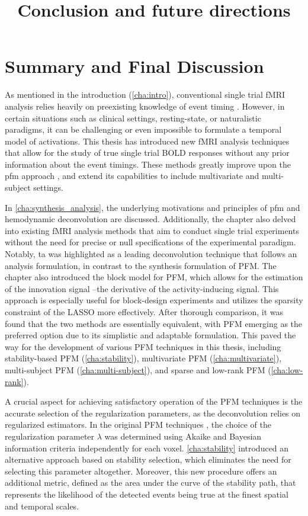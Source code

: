 \title{Conclusion and future directions}
\label{cha:conclusion}

\section{Summary and Final Discussion}

As mentioned in the introduction (\cref{cha:intro}), conventional single trial
fMRI analysis relies heavily on preexisting knowledge of event timing
\citep{Buckner1996Detectioncorticalactivation,Menon1998Mentalchronometryusing,Richter1997TimeresolvedfMRI}.
However, in certain situations such as clinical settings, resting-state, or
naturalistic paradigms, it can be challenging or even impossible to formulate a
temporal model of activations. This thesis has introduced new fMRI analysis
techniques that allow for the study of true single trial BOLD responses without
any prior information about the event timings. These methods greatly improve
upon the \acrlong*{pfm} approach \citep{Gaudes2013Paradigmfreemapping}, and
extend its capabilities to include multivariate and multi-subject settings.

In \cref{cha:synthesis_analysis}, the underlying motivations and principles of
\acrfull*{pfm} and hemodynamic deconvolution are discussed. Additionally, the
chapter also delved into existing fMRI analysis methods that aim to conduct
single trial experiments without the need for precise or null specifications of
the experimental paradigm. Notably, \acrfull*{ta} was highlighted as a leading
deconvolution technique that follows an analysis formulation, in contrast to the
synthesis formulation of PFM. The chapter also introduced the block model for
PFM, which allows for the estimation of the innovation signal --the derivative
of the activity-inducing signal. This approach is especially useful for
block-design experiments and utilizes the sparsity constraint of the LASSO more
effectively. After thorough comparison, it was found that the two methods are
essentially equivalent, with PFM emerging as the preferred option due to its
simplistic and adaptable formulation. This paved the way for the development of
various PFM techniques in this thesis, including stability-based PFM
(\cref{cha:stability}), multivariate PFM (\cref{cha:multivariate}),
multi-subject PFM (\cref{cha:multi-subject}), and sparse and low-rank PFM
(\cref{cha:low-rank}).

A crucial aspect for achieving satisfactory operation of the PFM techniques is
the accurate selection of the regularization parameters, as the deconvolution
relies on regularized estimators. In the original PFM techniques
\citep{Gaudes2013Paradigmfreemapping}, the choice of the regularization
parameter $\lambda$ was determined using Akaike and Bayesian information
criteria independently for each voxel. \cref{cha:stability} introduced an
alternative approach based on stability selection, which eliminates the need for
selecting this parameter altogether. Moreover, this new procedure offers an
additional metric, defined as the area under the curve of the stability path,
that represents the likelihood of the detected events being true at the finest
spatial and temporal scales.

